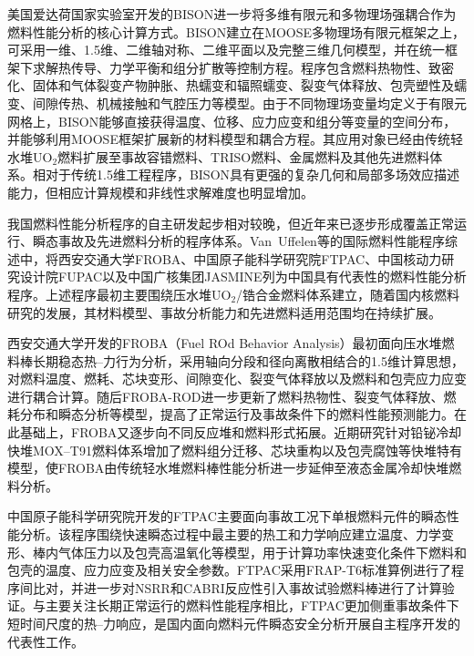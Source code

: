 美国爱达荷国家实验室开发的BISON进一步将多维有限元和多物理场强耦合作为燃料性能分析的核心计算方式。BISON建立在MOOSE多物理场有限元框架之上，可采用一维、1.5维、二维轴对称、二维平面以及完整三维几何模型，并在统一框架下求解热传导、力学平衡和组分扩散等控制方程\cite{williamsonBISONFlexibleCode2021}。程序包含燃料热物性、致密化、固体和气体裂变产物肿胀、热蠕变和辐照蠕变、裂变气体释放、包壳塑性及蠕变、间隙传热、机械接触和气腔压力等模型。由于不同物理场变量均定义于有限元网格上，BISON能够直接获得温度、位移、应力应变和组分等变量的空间分布，并能够利用MOOSE框架扩展新的材料模型和耦合方程。其应用对象已经由传统轻水堆UO$_2$燃料扩展至事故容错燃料、TRISO燃料、金属燃料及其他先进燃料体系。相对于传统1.5维工程程序，BISON具有更强的复杂几何和局部多场效应描述能力，但相应计算规模和非线性求解难度也明显增加。

我国燃料性能分析程序的自主研发起步相对较晚，但近年来已逐步形成覆盖正常运行、瞬态事故及先进燃料分析的程序体系。Van~Uffelen等\cite{vanuffelenReviewFuelPerformance2019}的国际燃料性能程序综述中，将西安交通大学FROBA、中国原子能科学研究院FTPAC、中国核动力研究设计院FUPAC以及中国广核集团JASMINE列为中国具有代表性的燃料性能分析程序。上述程序最初主要围绕压水堆UO$_2$/锆合金燃料体系建立，随着国内核燃料研究的发展，其材料模型、事故分析能力和先进燃料适用范围均在持续扩展。

西安交通大学开发的FROBA（Fuel ROd Behavior Analysis）最初面向压水堆燃料棒长期稳态热--力行为分析，采用轴向分段和径向离散相结合的1.5维计算思想，对燃料温度、燃耗、芯块变形、间隙变化、裂变气体释放以及燃料和包壳应力应变进行耦合计算\cite{yuDevelopmentFuelROd2012}。随后FROBA-ROD进一步更新了燃料热物性、裂变气体释放、燃耗分布和瞬态分析等模型，提高了正常运行及事故条件下的燃料性能预测能力\cite{liaoModificationUpdateFROBA2019}。在此基础上，FROBA又逐步向不同反应堆和燃料形式拓展。近期研究针对铅铋冷却快堆MOX--T91燃料体系增加了燃料组分迁移、芯块重构以及包壳腐蚀等快堆特有模型，使FROBA由传统轻水堆燃料棒性能分析进一步延伸至液态金属冷却快堆燃料分析\cite{dengUpgradeFROBACode2026}。

中国原子能科学研究院开发的FTPAC主要面向事故工况下单根燃料元件的瞬态性能分析。该程序围绕快速瞬态过程中最主要的热工和力学响应建立温度、力学变形、棒内气体压力以及包壳高温氧化等模型，用于计算功率快速变化条件下燃料和包壳的温度、应力应变及相关安全参数\cite{hanValidationApplicationFTPAC2014}。FTPAC采用FRAP-T6标准算例进行了程序间比对，并进一步对NSRR和CABRI反应性引入事故试验燃料棒进行了计算验证。与主要关注长期正常运行的燃料性能程序相比，FTPAC更加侧重事故条件下短时间尺度的热--力响应，是国内面向燃料元件瞬态安全分析开展自主程序开发的代表性工作。

